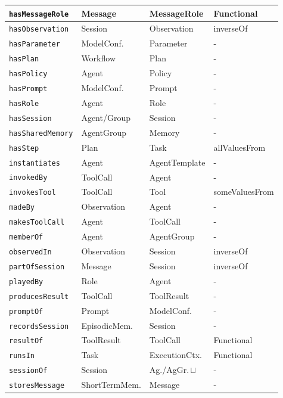 \documentclass[10pt, a4paper, twocolumn]{article}
\begin{document}
\begin{center}
\begin{tabular}{|p{2.1cm}|p{1.4cm}|p{1.4cm}|p{1.5cm}|}
\hline
\texttt{hasMessageRole} & Message & MessageRole & Functional \\
\hline
\texttt{hasObservation} & Session & Observation & inverseOf \\
\hline
\texttt{hasParameter} & ModelConf. & Parameter & {-} \\
\hline
\texttt{hasPlan} & Workflow & Plan & {-} \\
\hline
\texttt{hasPolicy} & Agent & Policy & {-} \\
\hline
\texttt{hasPrompt} & ModelConf. & Prompt & {-} \\
\hline
\texttt{hasRole} & Agent & Role & {-} \\
\hline
\texttt{hasSession} & Agent/Group & Session & {-} \\
\hline
\texttt{hasSharedMemory} & AgentGroup & Memory & {-} \\
\hline
\texttt{hasStep} & Plan & Task & allValuesFrom \\
\hline
\texttt{instantiates} & Agent & AgentTemplate & {-} \\
\hline
\texttt{invokedBy} & ToolCall & Agent & {-} \\
\hline
\texttt{invokesTool} & ToolCall & Tool & someValuesFrom \\
\hline
\texttt{madeBy} & Observation & Agent & {-} \\
\hline
\texttt{makesToolCall} & Agent & ToolCall & {-} \\
\hline
\texttt{memberOf} & Agent & AgentGroup & {-} \\
\hline
\texttt{observedIn} & Observation & Session & inverseOf \\
\hline
\texttt{partOfSession} & Message & Session & inverseOf \\
\hline
\texttt{playedBy} & Role & Agent & {-} \\
\hline
\texttt{producesResult} & ToolCall & ToolResult & {-} \\
\hline
\texttt{promptOf} & Prompt & ModelConf. & {-} \\
\hline
\texttt{recordsSession} & EpisodicMem. & Session & {-} \\
\hline
\texttt{resultOf} & ToolResult & ToolCall & Functional \\
\hline
\texttt{runsIn} & Task & ExecutionCtx. & Functional \\
\hline
\texttt{sessionOf} & Session & Ag./AgGr.\,$\sqcup$ & {-} \\
\hline
\texttt{storesMessage} & ShortTermMem. & Message & {-} \\

\end{tabular}
\end{center}
\end{document}
